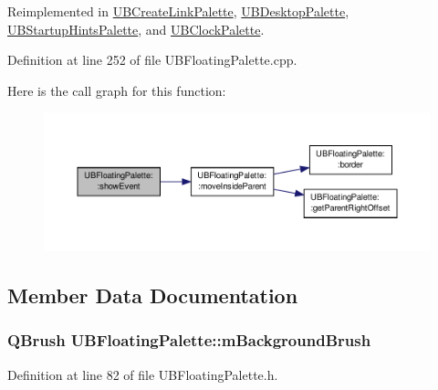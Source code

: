 Reimplemented in \hyperlink{class_u_b_create_link_palette_a84493dda08b44ff851c683df649acbf1}{U\-B\-Create\-Link\-Palette}, \hyperlink{class_u_b_desktop_palette_a1d1a55372fc59e681f23cfd895716a8c}{U\-B\-Desktop\-Palette}, \hyperlink{class_u_b_startup_hints_palette_a8b1252835307d05ac38c24059548e822}{U\-B\-Startup\-Hints\-Palette}, and \hyperlink{class_u_b_clock_palette_af46e4aa5486523a69f906f3cbf744612}{U\-B\-Clock\-Palette}.



Definition at line 252 of file U\-B\-Floating\-Palette.\-cpp.



Here is the call graph for this function\-:
\nopagebreak
\begin{figure}[H]
\begin{center}
\leavevmode
\includegraphics[width=350pt]{d1/d97/class_u_b_floating_palette_ad1b5652affcca631745df045446974fa_cgraph}
\end{center}
\end{figure}




\subsection{Member Data Documentation}
\hypertarget{class_u_b_floating_palette_a9911f9e0bdae7562c1327a955974a8e4}{
\subsubsection[{m\-Background\-Brush}]{\setlength{\rightskip}{0pt plus 5cm}Q\-Brush U\-B\-Floating\-Palette\-::m\-Background\-Brush\hspace{0.3cm}{\ttfamily [protected]}}}\label{d1/d97/class_u_b_floating_palette_a9911f9e0bdae7562c1327a955974a8e4}


Definition at line 82 of file U\-B\-Floating\-Palette.\-h.

